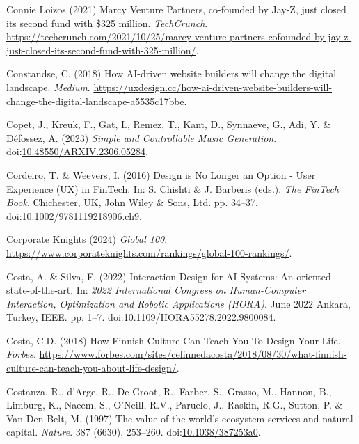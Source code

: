 \documentclass[
  letterpaper,
  DIV=11,
  numbers=noendperiod]{scrartcl}
\newlength{\cslhangindent}
\newenvironment{CSLReferences}[2] %
 {\begin{list}{}{%
  \setlength{\itemindent}{0pt}
  \setlength{\leftmargin}{0pt}
  \setlength{\parsep}{0pt}
  \ifodd #1
   \setlength{\leftmargin}{\cslhangindent}
   \setlength{\itemindent}{-1\cslhangindent}
  \fi
  \setlength{\itemsep}{#2\baselineskip}}}
 {\end{list}}
\begin{document}
\begin{CSLReferences}{0}{1}
Connie Loizos (2021) Marcy {Venture Partners}, co-founded by {Jay-Z},
just closed its second fund with \$325 million. \emph{TechCrunch}.
\url{https://techcrunch.com/2021/10/25/marcy-venture-partners-cofounded-by-jay-z-just-closed-its-second-fund-with-325-million/}.

Constandse, C. (2018) How {AI-driven} website builders will change the
digital landscape. \emph{Medium}.
\url{https://uxdesign.cc/how-ai-driven-website-builders-will-change-the-digital-landscape-a5535c17bbe}.

Copet, J., Kreuk, F., Gat, I., Remez, T., Kant, D., Synnaeve, G., Adi,
Y. \& Défossez, A. (2023) \emph{Simple and {Controllable Music
Generation}}.
doi:\href{https://doi.org/10.48550/ARXIV.2306.05284}{10.48550/ARXIV.2306.05284}.

Cordeiro, T. \& Weevers, I. (2016) Design is {No Longer} an {Option} -
{User Experience} ({UX}) in {FinTech}. In: S. Chishti \& J. Barberis
(eds.). \emph{The {FinTech Book}}. Chichester, UK, John Wiley \& Sons,
Ltd. pp. 34--37.
doi:\href{https://doi.org/10.1002/9781119218906.ch9}{10.1002/9781119218906.ch9}.

Corporate Knights (2024) \emph{Global 100}.
\url{https://www.corporateknights.com/rankings/global-100-rankings/}.

Costa, A. \& Silva, F. (2022) Interaction {Design} for {AI Systems}:
{An} oriented state-of-the-art. In: \emph{2022 {International Congress}
on {Human-Computer Interaction}, {Optimization} and {Robotic
Applications} ({HORA})}. June 2022 Ankara, Turkey, IEEE. pp. 1--7.
doi:\href{https://doi.org/10.1109/HORA55278.2022.9800084}{10.1109/HORA55278.2022.9800084}.

Costa, C.D. (2018) How {Finnish Culture Can Teach You To Design Your
Life}. \emph{Forbes}.
\url{https://www.forbes.com/sites/celinnedacosta/2018/08/30/what-finnish-culture-can-teach-you-about-life-design/}.

Costanza, R., d'Arge, R., De Groot, R., Farber, S., Grasso, M., Hannon,
B., Limburg, K., Naeem, S., O'Neill, R.V., Paruelo, J., Raskin, R.G.,
Sutton, P. \& Van Den Belt, M. (1997) The value of the world's ecosystem
services and natural capital. \emph{Nature}. 387 (6630), 253--260.
doi:\href{https://doi.org/10.1038/387253a0}{10.1038/387253a0}.


\end{CSLReferences}
\end{document}
